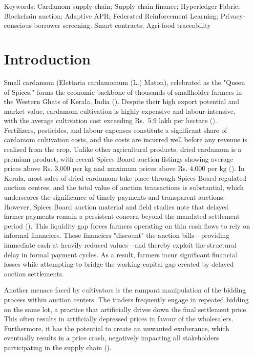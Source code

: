 \documentclass[12pt]{article}
\newcommand{\rupee}{Rs.}
\begin{document}
	
	
	
	
Keywords: Cardamom supply chain; Supply chain finance; Hyperledger Fabric; Blockchain auction; Adaptive APR; Federated Reinforcement Learning; Privacy-conscious borrower screening; Smart contracts; Agri-food traceability
	
	
	
	\section{Introduction}
	
	Small cardamom (Elettaria cardamomum (L.) Maton), celebrated as the "Queen of Spices," forms the economic backbone of thousands of smallholder farmers in the Western Ghats of Kerala, India (\cite{murugan_governance_2024}). Despite their high export potential and market value, cardamom cultivation is highly expensive and labour-intensive, with the average cultivation cost exceeding \rupee~5.9 lakh per hectare (\cite{murugan_governance_2024}). 
	Fertilizers, pesticides, and labour expenses constitute a significant share of cardamom cultivation costs, and the costs are incurred well before any revenue is realised from the crop. Unlike other agricultural products, dried cardamom is a premium product, with recent Spices Board auction listings showing average prices above \rupee{} 3,000 per kg and maximum prices above \rupee{} 4,000 per kg (\cite{spicesboard_daily_price_2026}). In Kerala, most sales of dried cardamom take place through Spices Board-regulated auction centres, and the total value of auction transactions is substantial, which underscores the significance of timely payments and transparent auctions. However, Spices Board auction material and field studies note that delayed farmer payments remain a persistent concern beyond the mandated settlement period (\cite{spicesboard_cardamom_auction,murugan_governance_2024}). This liquidity gap forces farmers operating on thin cash flows to rely on informal financiers. These financiers "discount" the auction bills---providing immediate cash at heavily reduced values---and thereby exploit the structural delay in formal payment cycles. As a result, farmers incur significant financial losses while attempting to bridge the working-capital gap created by delayed auction settlements.
	
	Another menace faced by cultivators is the rampant manipulation of the bidding process within auction centers. The traders frequently engage in repeated bidding on the same lot, a practice that artificially drives down the final settlement price. This often results in artificially depressed prices in favour of the wholesalers. Furthermore, it has the potential to create an unwanted exuberance, which eventually results in a price crash, negatively impacting all stakeholders participating in the supply chain (\cite{reddy_status_2016}).
	
\end{document}
